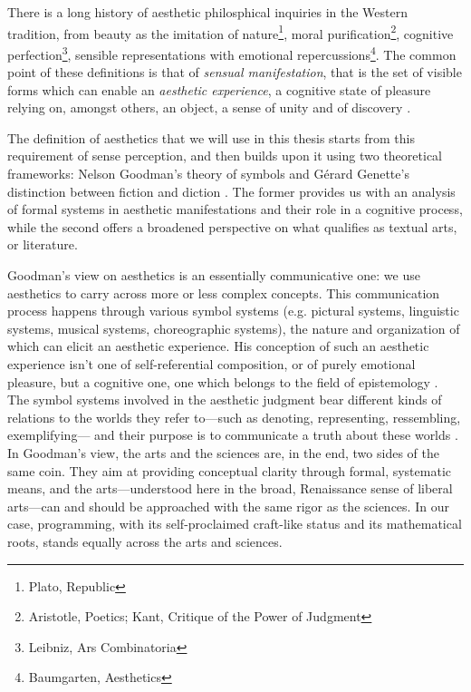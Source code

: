 There is a long history of aesthetic philosphical inquiries in the Western tradition, from beauty as the imitation of nature\footnote{Plato, Republic}, moral purification\footnote{Aristotle, Poetics; Kant, Critique of the Power of Judgment}, cognitive perfection\footnote{Leibniz, Ars Combinatoria}, sensible representations with emotional repercussions\footnote{Baumgarten, Aesthetics}. The common point of these definitions is that of \emph{sensual manifestation}, that is the set of visible forms which can enable an \emph{aesthetic experience}, a cognitive state of pleasure relying on, amongst others, an object, a sense of unity and of discovery \citep{beardsley_aesthetic_1970}.

The definition of aesthetics that we will use in this thesis starts from this requirement of sense perception, and then builds upon it using two theoretical frameworks: Nelson Goodman's theory of symbols \citep{goodman_languages_1976} and Gérard Genette's distinction between fiction and diction \citep{genette_fiction_1993}. The former provides us with an analysis of formal systems in aesthetic manifestations and their role in a cognitive process, while the second offers a broadened perspective on what qualifies as textual arts, or literature.

Goodman's view on aesthetics is an essentially communicative one: we use aesthetics to carry across more or less complex concepts. This communication process happens through various symbol systems (e.g. pictural systems, linguistic systems, musical systems, choreographic systems), the nature and organization of which can elicit an aesthetic experience. His conception of such an aesthetic experience isn't one of self-referential composition, or of purely emotional pleasure, but a cognitive one, one which belongs to the field of epistemology \citep{goodman_languages_1976}. The symbol systems involved in the aesthetic judgment bear different kinds of relations to the worlds they refer to—such as denoting, representing, ressembling, exemplifying— and their purpose is to communicate a truth about these worlds \citep{goodman_ways_1978}. In Goodman's view, the arts and the sciences are, in the end, two sides of the same coin. They aim at providing conceptual clarity through formal, systematic means, and the arts—understood here in the broad, Renaissance sense of liberal arts—can and should be approached with the same rigor as the sciences. In our case, programming, with its self-proclaimed craft-like status and its mathematical roots, stands equally across the arts and sciences.

